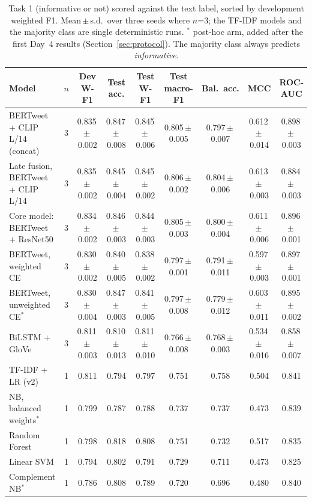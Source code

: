 \documentclass[conference]{IEEEtran}
\newcommand{\pmse}[2]{#1\,$\pm$\,#2}
\begin{document}
\begin{table}[t]
\centering
\caption{Task 1 (informative or not) scored against the text label, sorted by development weighted F1. Mean\,$\pm$\,s.d.\ over three seeds where $n$=3; the TF-IDF models and the majority class are single deterministic runs. $^\ast$ post-hoc arm, added after the first Day~4 results (Section~\ref{sec:protocol}). The majority class always predicts \emph{informative}.}
\label{tab:t1explore}
\footnotesize
\setlength{\tabcolsep}{3pt}
\begin{tabular}{lcccccccc}
\toprule
Model & $n$ & Dev W-F1 & Test acc. & Test W-F1 & Test macro-F1 & Bal.\ acc. & MCC & ROC-AUC \\
\midrule
BERTweet + CLIP L/14 (concat) & 3 & \pmse{0.835}{0.002} & \pmse{0.847}{0.008} & \pmse{0.845}{0.006} & \pmse{0.805}{0.005} & \pmse{0.797}{0.007} & \pmse{0.612}{0.014} & \pmse{0.898}{0.003} \\
Late fusion, BERTweet + CLIP L/14 & 3 & \pmse{0.835}{0.002} & \pmse{0.845}{0.004} & \pmse{0.845}{0.002} & \pmse{0.806}{0.002} & \pmse{0.804}{0.006} & \pmse{0.613}{0.003} & \pmse{0.884}{0.003} \\
Core model: BERTweet + ResNet50 & 3 & \pmse{0.834}{0.002} & \pmse{0.846}{0.003} & \pmse{0.844}{0.003} & \pmse{0.805}{0.003} & \pmse{0.800}{0.004} & \pmse{0.611}{0.006} & \pmse{0.896}{0.001} \\
BERTweet, weighted CE & 3 & \pmse{0.830}{0.002} & \pmse{0.840}{0.005} & \pmse{0.838}{0.002} & \pmse{0.797}{0.001} & \pmse{0.791}{0.011} & \pmse{0.597}{0.003} & \pmse{0.897}{0.001} \\
BERTweet, unweighted CE$^\ast$ & 3 & \pmse{0.830}{0.004} & \pmse{0.847}{0.003} & \pmse{0.841}{0.005} & \pmse{0.797}{0.008} & \pmse{0.779}{0.012} & \pmse{0.603}{0.011} & \pmse{0.895}{0.002} \\
BiLSTM + GloVe & 3 & \pmse{0.811}{0.003} & \pmse{0.810}{0.013} & \pmse{0.811}{0.010} & \pmse{0.766}{0.008} & \pmse{0.768}{0.003} & \pmse{0.534}{0.016} & \pmse{0.858}{0.007} \\
TF-IDF + LR (v2) & 1 & 0.811 & 0.794 & 0.797 & 0.751 & 0.758 & 0.504 & 0.841 \\
NB, balanced weights$^\ast$ & 1 & 0.799 & 0.787 & 0.788 & 0.737 & 0.737 & 0.473 & 0.839 \\
Random Forest & 1 & 0.798 & 0.818 & 0.808 & 0.751 & 0.732 & 0.517 & 0.835 \\
Linear SVM & 1 & 0.794 & 0.802 & 0.791 & 0.729 & 0.711 & 0.473 & 0.825 \\
Complement NB$^\ast$ & 1 & 0.786 & 0.808 & 0.789 & 0.720 & 0.696 & 0.480 & 0.840 \\

\end{tabular}
\end{table}
\end{document}
